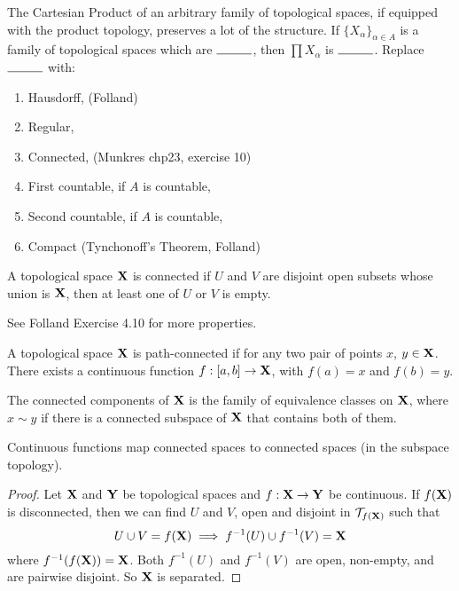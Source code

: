 \documentclass[../../main.tex]{subfiles}
\begin{document}
\newpage





\newpage


The Cartesian Product of an arbitrary family of topological spaces, if equipped with the product topology, preserves a lot of the structure. If $\{X_\alpha\}_{\alpha\in A}$ is a family of topological spaces which are $\rule{1cm}{0.15mm}$, then $\prod X_\alpha$ is $\rule{1cm}{0.15mm}$. Replace $\rule{1cm}{0.15mm}$ with: 

\begin{enumerate}
    \item Hausdorff, (Folland)
    \item Regular,
    \item Connected, (Munkres chp23, exercise 10)
    \item First countable, if $A$ is countable,
    \item Second countable, if $A$ is countable,
    \item Compact (Tynchonoff's Theorem, Folland)
\end{enumerate}

\newpage


\begin{definition}[Connectedness]\label{chp4:connectedness-definition}
    A topological space ${\mathbf{X}}$ is connected if $U$ and $V$ are disjoint open subsets whose union is ${\mathbf{X}}$, then at least one of $U$ or $V$ is empty.
\end{definition}
See Folland Exercise 4.10 for more properties.

\begin{definition}\label{chp4:path-connectedness-definition}
    A topological space ${\mathbf{X}}$ is path-connected if for any two pair of points $x$, $y\in{\mathbf{X}}$. There exists a continuous function $f:[a,b]\to {\mathbf{X}}$, with $f(a)=x$ and $f(b)=y$.
\end{definition}

\begin{definition}\label{chp4:connected-component-definition}
    The connected components of ${\mathbf{X}}$ is the family of equivalence classes on ${\mathbf{X}}$, where $x\sim y$ if there is a connected subspace of ${\mathbf{X}}$ that contains both of them.
\end{definition}


\begin{wts}
    Continuous functions map connected spaces to connected spaces (in the subspace topology).
\end{wts}
\begin{proof}
    Let ${\mathbf{X}}$ and ${\mathbf{Y}}$ be topological spaces and $f: {\mathbf{X}}\to{\mathbf{Y}}$ be continuous. If $f({\mathbf{X}})$ is disconnected, then we can find $U$ and $V$, open and disjoint in $\mathcal{T}_{f({\mathbf{X}})}$ such that
    \[
        U\cup V = f({\mathbf{X}})\implies f^{-1}(U)\cup f^{-1}(V) = {\mathbf{X}}
    \]
    where $f^{-1}(f({\mathbf{X}})) = {\mathbf{X}}$. Both $f^{-1}(U)$ and $f^{-1}(V)$ are open, non-empty, and are pairwise disjoint. So ${\mathbf{X}}$ is separated.
\end{proof}
\end{document}
